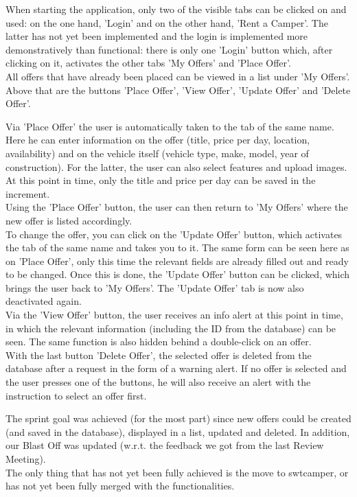 When starting the application, only two of the visible tabs can be clicked on and used: on the one hand, 'Login' and on the other hand, 'Rent a Camper'. The latter has not yet been implemented and the login is implemented more demonstratively than functional: there is only one 'Login' button which, after clicking on it, activates the other tabs 'My Offers' and 'Place Offer'. \\
All offers that have already been placed can be viewed in a list under 'My Offers'. Above that are the buttons 'Place Offer', 'View Offer', 'Update Offer' and 'Delete Offer'. 

Via 'Place Offer' the user is automatically taken to the tab of the same name. Here he can enter information on the offer (title, price per day, location, availability) and on the vehicle itself (vehicle type, make, model, year of construction). For the latter, the user can also select features and upload images. At this point in time, only the title and price per day can be saved in the increment. \\
Using the 'Place Offer' button, the user can then return to 'My Offers' where the new offer is listed accordingly. \\
To change the offer, you can click on the 'Update Offer' button, which activates the tab of the same name and takes you to it. The same form can be seen here as on 'Place Offer', only this time the relevant fields are already filled out and ready to be changed. Once this is done, the 'Update Offer' button can be clicked, which brings the user back to 'My Offers'. The 'Update Offer' tab is now also deactivated again. \\
Via the 'View Offer' button, the user receives an info alert at this point in time, in which the relevant information (including the ID from the database) can be seen. The same function is also hidden behind a double-click on an offer. \\
With the last button 'Delete Offer', the selected offer is deleted from the database after a request in the form of a warning alert. If no offer is selected and the user presses one of the buttons, he will also receive an alert with the instruction to select an offer first.

The sprint goal was achieved (for the most part) since new offers could be created (and saved in the database), displayed in a list, updated and deleted. In addition, our Blast Off was updated (w.r.t. the feedback we got from the last Review Meeting). \\
The only thing that has not yet been fully achieved is the move to swtcamper, or has not yet been fully merged with the functionalities.

